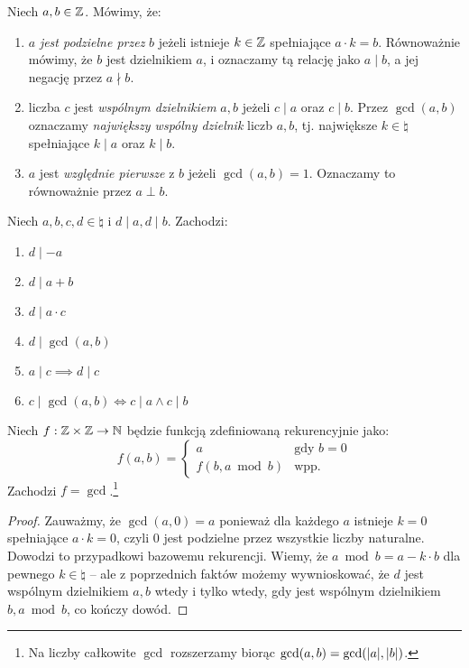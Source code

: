 
\begin{definition}[Notacja]
	Niech \(a, b \in \mathbb{Z}\). Mówimy, że:
	\begin{enumerate}
		\item \(a\) \textit{jest podzielne przez} \(b\) jeżeli istnieje \(k \in \mathbb{Z}\)
		      spełniające \(a \cdot k = b\). Równoważnie mówimy, że \(b\) jest dzielnikiem \(a\),
		      i oznaczamy tą relację jako \(a \mid b\), a jej negację przez \(a \nmid b\).
		\item liczba \(c\) jest \textit{wspólnym dzielnikiem} \(a, b\) jeżeli \(c \mid a\) oraz \(c \mid b\).
		      Przez \(\gcd(a, b)\) oznaczamy \textit{największy wspólny dzielnik} liczb \(a, b\), tj. największe
		      \(k \in \natural\) spełniające \(k \mid a\) oraz \(k \mid b\).
		\item \(a\) jest \textit{względnie pierwsze} z \(b\) jeżeli \(\gcd(a, b) = 1\).
		      Oznaczamy to równoważnie przez \(a \perp b\).
	\end{enumerate}
\end{definition}

\begin{fact}
	Niech \(a, b, c, d \in \natural\) i \(d \mid a, d \mid b\). Zachodzi:
	\begin{enumerate}
		\item \(d \mid -a\)
		\item \(d \mid a+b\)
		\item \(d \mid a\cdot c\)
		\item \(d \mid \gcd(a, b)\)
		\item \(a \mid c \implies d \mid c\)
		\item \(c \mid \gcd(a, b) \iff c \mid a \land c \mid b\)
	\end{enumerate}
\end{fact}

\begin{theorem}
	\label{nt:euklides}
	Niech \(f: \mathbb{Z} \times \mathbb{Z} \to \mathbb{N}\) będzie funkcją zdefiniowaną rekurencyjnie jako:
	\begin{equation*}
		f(a, b) = \begin{cases}
			a                & \text{gdy } b = 0 \\
			f(b, a \bmod{b}) & \text{wpp.}
		\end{cases}
	\end{equation*}
	Zachodzi \(f = \gcd\).\footnote{Na liczby całkowite \(\gcd\) rozszerzamy biorąc \(\gcd(a, b) = \gcd(\abs{a}, \abs{b})\).}
\end{theorem}
\begin{proof}
	Zauważmy, że \(\gcd(a, 0) = a\) ponieważ dla każdego \(a\) istnieje \(k = 0\) spełniające \(a \cdot k = 0\), czyli \(0\) jest podzielne przez wszystkie liczby naturalne.
	Dowodzi to przypadkowi bazowemu rekurencji.
	Wiemy, że \(a \bmod b = a - k \cdot b\) dla pewnego \(k \in \natural\) -- ale
	z poprzednich faktów możemy wywnioskować, że \(d\) jest wspólnym dzielnikiem \(a, b\)
	wtedy i tylko wtedy, gdy jest wspólnym dzielnikiem \(b, a \bmod b\), co kończy dowód.
\end{proof}

